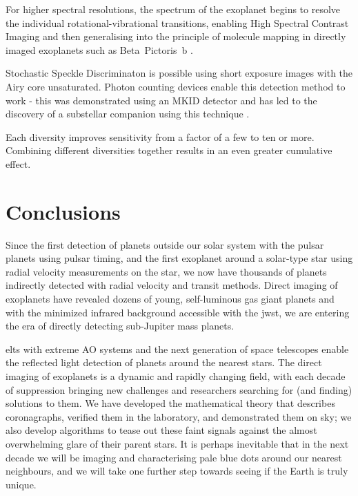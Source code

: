 \documentclass[letterpaper]{ar-1col}
\begin{document}
For higher spectral resolutions, the spectrum of the exoplanet begins to resolve the individual rotational-vibrational transitions, enabling High Spectral Contrast Imaging \citep[including the detection of HD~209458b ][]{Snellen10} and then generalising into the principle of molecule mapping in directly imaged exoplanets such as Beta~Pictoris~b \citep{Hoeijmakers18}.

Stochastic Speckle Discriminaton \citep[SSD; ][]{Gladysz09} is possible using short exposure images with the Airy core unsaturated.
%
Photon counting devices enable this detection method to work - this was demonstrated using an MKID detector and has led to the discovery of a substellar companion using this technique \citep{Steiger21}.

Each diversity improves sensitivity from a factor of a few to ten or more.
%
Combining different diversities together results in an even greater cumulative effect.

\section{Conclusions}

Since the first detection of planets outside our solar system with the pulsar planets \citep{Wolszczan92} using pulsar timing, and the first exoplanet around a solar-type star \citep[51 Peg b; ][]{Mayor95} using radial velocity measurements on the star, we now have thousands of planets indirectly detected with radial velocity and transit methods.
%
Direct imaging of exoplanets have revealed dozens of young, self-luminous gas giant planets \citep{Currie23,Chauvin24} and with the minimized infrared background accessible with the \ac{jwst}, we are entering the era of directly detecting sub-Jupiter mass planets.

\acp{elt} with extreme AO systems and the next generation of space telescopes enable the reflected light detection of planets around the nearest stars.
%
The direct imaging of exoplanets is a dynamic and rapidly changing field, with each decade of suppression bringing new challenges and researchers searching for (and finding) solutions to them.
%
We have developed the mathematical theory that describes coronagraphs, verified them in the laboratory, and demonstrated them on sky; we also develop algorithms to tease out these faint signals against the almost overwhelming glare of their parent stars.
%
It is perhaps inevitable that in the next decade we will be imaging and characterising pale blue dots around our nearest neighbours, and we will take one further step towards seeing if the Earth is truly unique.
\end{document}
